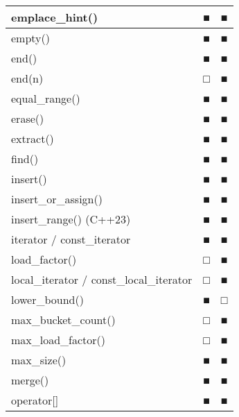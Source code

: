 \begin{longtable}{|l|l|l|}
emplace\_hint()                              & ■            & ■                       \\ \hline
empty()                                      & ■            & ■                       \\ \hline
end()                                        & ■            & ■                       \\ \hline
end(n)                                       & □            & ■                       \\ \hline
equal\_range()                               & ■            & ■                       \\ \hline
erase()                                      & ■            & ■                       \\ \hline
extract()                                    & ■            & ■                       \\ \hline
find()                                       & ■            & ■                       \\ \hline
insert()                                     & ■            & ■                       \\ \hline
insert\_or\_assign()                         & ■            & ■                       \\ \hline
insert\_range() (C++23)                      & ■            & ■                       \\ \hline
iterator / const\_iterator                   & ■            & ■                       \\ \hline
load\_factor()                               & □            & ■                       \\ \hline
local\_iterator / const\_local\_iterator     & □            & ■                       \\ \hline
lower\_bound()                               & ■            & □                       \\ \hline
max\_bucket\_count()                         & □            & ■                       \\ \hline
max\_load\_factor()                          & □            & ■                       \\ \hline
max\_size()                                  & ■            & ■                       \\ \hline
merge()                                      & ■            & ■                       \\ \hline
operator{[}{]}                               & ■            & ■                       \\ \hline

\end{longtable}
